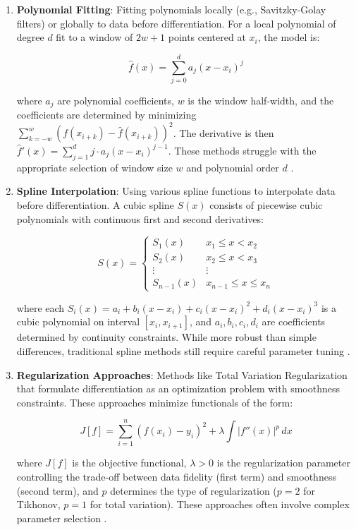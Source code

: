 \documentclass[10pt,journal,compsoc]{IEEEtran}
\begin{document}
\begin{enumerate}
    \item \textbf{Polynomial Fitting}: Fitting polynomials locally (e.g., Savitzky-Golay filters) or globally to data before differentiation. For a local polynomial of degree $d$ fit to a window of $2w+1$ points centered at $x_i$, the model is:
    
    \begin{equation}
        \hat{f}(x) = \sum_{j=0}^{d} a_j (x - x_i)^j
    \end{equation}
    
    where $a_j$ are polynomial coefficients, $w$ is the window half-width, and the coefficients are determined by minimizing $\sum_{k=-w}^{w} \left(f(x_{i+k}) - \hat{f}(x_{i+k})\right)^2$. The derivative is then $\hat{f}'(x) = \sum_{j=1}^{d} j \cdot a_j (x - x_i)^{j-1}$. These methods struggle with the appropriate selection of window size $w$ and polynomial order $d$ \cite{savitzky1964smoothing}.
    
    \item \textbf{Spline Interpolation}: Using various spline functions to interpolate data before differentiation. A cubic spline $S(x)$ consists of piecewise cubic polynomials with continuous first and second derivatives:
    
    \begin{equation}
        S(x) = \begin{cases}
            S_1(x) & x_1 \leq x < x_2 \\
            S_2(x) & x_2 \leq x < x_3 \\
            \vdots & \vdots \\
            S_{n-1}(x) & x_{n-1} \leq x \leq x_n
        \end{cases}
    \end{equation}
    
    where each $S_i(x) = a_i + b_i(x-x_i) + c_i(x-x_i)^2 + d_i(x-x_i)^3$ is a cubic polynomial on interval $[x_i, x_{i+1}]$, and $a_i, b_i, c_i, d_i$ are coefficients determined by continuity constraints. While more robust than simple differences, traditional spline methods still require careful parameter tuning \cite{ramsay2005functional}.
    
    \item \textbf{Regularization Approaches}: Methods like Total Variation Regularization that formulate differentiation as an optimization problem with smoothness constraints. These approaches minimize functionals of the form:
    
    \begin{equation}
        J[f] = \sum_{i=1}^{n} \left(f(x_i) - y_i\right)^2 + \lambda \int \left|f''(x)\right|^p \, dx
    \end{equation}
    
    where $J[f]$ is the objective functional, $\lambda > 0$ is the regularization parameter controlling the trade-off between data fidelity (first term) and smoothness (second term), and $p$ determines the type of regularization ($p=2$ for Tikhonov, $p=1$ for total variation). These approaches often involve complex parameter selection \cite{chartrand2011numerical}.
\end{enumerate}
\end{document}
